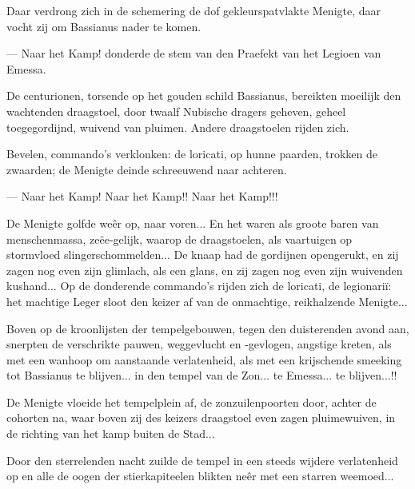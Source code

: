 \documentclass[a4paper, 12pt, oneside, dutch]{article}
\begin{document}
Daar verdrong zich in de schemering de dof gekleurspatvlakte Menigte, daar vocht zij om Bassianus nader te komen.

--- Naar het Kamp! donderde de stem van den Praefekt van het Legioen van Emessa.

De centurionen, torsende op het gouden schild Bassianus, bereikten moeilijk den wachtenden draagstoel, door twaalf Nubische dragers geheven, geheel toegegordijnd, wuivend van pluimen. Andere draagstoelen rijden zich.

Bevelen, commando's verklonken: de loricati, op hunne paarden, trokken de zwaarden; de Menigte deinde schreeuwend naar achteren.

--- Naar het Kamp! Naar het Kamp!! Naar het Kamp!!!

De Menigte golfde weêr op, naar voren... En het waren als groote baren van menschenmassa, zeëe-gelijk, waarop de draagstoelen, als vaartuigen op stormvloed slingerschommelden... De knaap had de gordijnen opengerukt, en zij zagen nog even zijn glimlach, als een glans, en zij zagen nog even zijn wuivenden kushand... Op de donderende commando's rijden zich de loricati, de legionariï: het machtige Leger sloot den keizer af van de onmachtige, reikhalzende Menigte...

Boven op de kroonlijsten der tempelgebouwen, tegen den duisterenden avond aan, snerpten de verschrikte pauwen, weggevlucht en -gevlogen, angstige kreten, als met een wanhoop om aanstaande verlatenheid, als met een krijschende smeeking tot Bassianus te blijven... in den tempel van de Zon... te Emessa... te blijven...!!

De Menigte vloeide het tempelplein af, de zonzuilenpoorten door, achter de cohorten na, waar boven zij des keizers draagstoel even zagen pluimewuiven, in de richting van het kamp buiten de Stad...

Door den sterrelenden nacht zuilde de tempel in een steeds wijdere verlatenheid op en alle de oogen der stierkapiteelen blikten neêr met een starren weemoed...

\subsection{}
\end{document}

